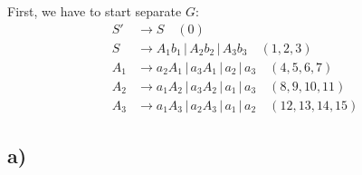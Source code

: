 First, we have to start separate $G$:
\begin{equation*}
\begin{split}
	S' &\rightarrow S \quad(0)\\
	S &\rightarrow A_1b_1 \,|\, A_2b_2 \,|\, A_3b_3 \quad(1, 2, 3)\\
	A_1 &\rightarrow a_2A_1 \,|\, a_3A_1 \,|\, a_2 \,|\, a_3 \quad(4, 5, 6, 7)\\
	A_2 &\rightarrow a_1A_2 \,|\, a_3A_2 \,|\, a_1 \,|\, a_3 \quad(8, 9, 10, 11)\\
	A_3 &\rightarrow a_1A_3 \,|\, a_2A_3 \,|\, a_1 \,|\, a_2 \quad(12, 13, 14, 15)
\end{split}
\end{equation*}

\subsection*{a)}

